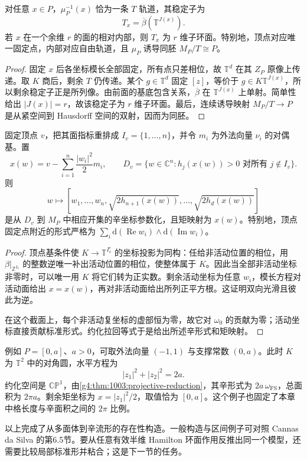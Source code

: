 \begin{proposition}\label{g4:prop:1203:orbit-fibres}
	对任意 \(x\in P\)，\(\mu_P^{-1}(x)\) 恰为一条 \(T\) 轨道，其稳定子为
	\[
		T_x=\overline\beta(\mathbb T^{J(x)}).
	\]
	若 \(x\) 在一个余维 \(r\) 的面的相对内部，则 \(T_x\) 为 \(r\) 维子环面。特别地，顶点对应唯一固定点，内部对应自由轨道，且 \(\mu_P\) 诱导同胚 \(M_P/T\cong P\)。
\end{proposition}
\begin{proof}
	固定 \(x\) 后各坐标模长全部固定，所有点只差相位，故 \(\mathbb T^d\) 在其 \(Z_P\) 原像上传递。取 \(K\) 商后，剩余 \(T\) 仍传递。某个 \(g\in\mathbb T^d\) 固定 \([z]\)，等价于 \(g\in K\mathbb T^{J(x)}\)，所以剩余稳定子正是所列像。由前面的基底包含关系，\(\overline\beta\) 在 \(\mathbb T^{J(x)}\) 上单射。简单性给出 \(|J(x)|=r\)，故该稳定子为 \(r\) 维子环面。最后，连续诱导映射 \(M_P/T\to P\) 是从紧空间到 Hausdorff 空间的双射，因而为同胚。
\end{proof}

\begin{proposition}\label{g4:prop:1203:vertex-chart}
	固定顶点 \(v\)，把其面指标重排成 \(I_v=\{1,\ldots,n\}\)，并令 \(m_i\) 为外法向量 \(\nu_i\) 的对偶基。置
	\[
		x(w)=v-\sum_{i=1}^n\frac{|w_i|^2}{2}m_i,\qquad
		D_v=\{w\in\mathbb C^n:h_j(x(w))>0\text{ 对所有 }j\notin I_v\}.
	\]
	则
	\[
		w\longmapsto
		\left[
		w_1,\ldots,w_n,\sqrt{2h_{n+1}(x(w))},\ldots,\sqrt{2h_d(x(w))}
		\right]
	\]
	是从 \(D_v\) 到 \(M_P\) 中相应开集的辛坐标参数化，且矩映射为 \(x(w)\)。特别地，顶点固定点附近的形式严格为
	\(\sum_i\mathrm{d}(\operatorname{Re}w_i)\wedge\mathrm{d}(\operatorname{Im}w_i)\)。
\end{proposition}
\begin{proof}
	顶点基条件使 \(K\to\mathbb T^{I_v^c}\) 的坐标投影为同构：任给非活动位置的相位，用 \(\beta|_{\mathbb Z^{I_v}}\) 的整数逆唯一补出活动位置的相位，使整体属于 \(K\)。因此当全部非活动坐标非零时，可以唯一用 \(K\) 将它们转为正实数。剩余活动坐标为任意 \(w_i\)，模长方程对活动面给出 \(x=x(w)\)，再对非活动面给出所列正平方根。这证明双向光滑且彼此为逆。

	在这个截面上，每个非活动复坐标的虚部恒为零，故它对 \(\omega_0\) 的贡献为零；活动坐标直接贡献标准形式。约化拉回等式于是给出所述辛形式和矩映射。
\end{proof}

例如 \(P=[0,a]\)、\(a>0\)，可取外法向量 \((-1,1)\) 与支撑常数 \((0,a)\)。此时 \(K\) 为 \(\mathbb T^2\) 中的对角圆，水平方程为
\[
	|z_1|^2+|z_2|^2=2a.
\]
约化空间是 \(\mathbb{CP}^1\)，由\cref{g4:thm:1003:projective-reduction}，其辛形式为 \(2a\,\omega_{\mathrm{FS}}\)，总面积为 \(2\pi a\)。剩余矩坐标为 \(x=|z_1|^2/2\)，取值恰为 \([0,a]\)。这个例子也固定了本章中格长度与辛面积之间的 \(2\pi\) 比例。

\ProseParagraphBreak

以上完成了从多面体到辛流形的存在性构造。一般构造与区间例子可对照 Cannas da Silva 的第6.5节。\cite[第174--178页]{Cannas2006Symplectic}要从任意有效半维 Hamilton 环面作用反推出同一个模型，还需要比较局部标准形并粘合；这是下一节的任务。
